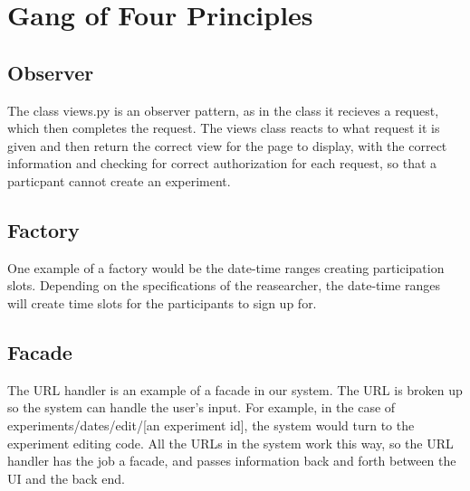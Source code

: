 \section{Gang of Four Principles}
\subsection{Observer}
The class views.py is an observer pattern, as in the class it recieves a request, which then completes the request.  The views class reacts to what request it is given and then return the correct view for the page to display, with the correct information and checking for correct authorization for each request, so that a particpant cannot create an experiment.

\subsection{Factory}
One example of a factory would be the date-time ranges creating participation slots.  Depending on the specifications of the reasearcher, the date-time ranges will create time slots for the participants to sign up for.

\subsection{Facade}
The URL handler is an example of a facade in our system.  The URL is broken up so the system can handle the user's input.  For example, in the case of experiments/dates/edit/[an experiment id], the system would turn to the experiment editing code.  All the URLs in the system work this way, so the URL handler has the job a facade, and passes information back and forth between the UI and the back end.
